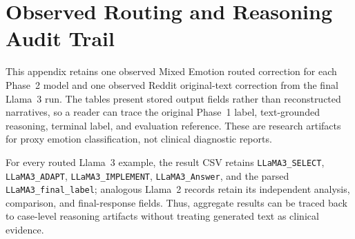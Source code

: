 \documentclass{ieeeaccess}
\begin{document}
\section{Observed Routing and Reasoning Audit Trail}

This appendix retains one observed Mixed Emotion routed correction for each Phase~2 model and one observed Reddit original-text correction from the final Llama~3 run. The tables present stored output fields rather than reconstructed narratives, so a reader can trace the original Phase~1 label, text-grounded reasoning, terminal label, and evaluation reference. These are research artifacts for proxy emotion classification, not clinical diagnostic reports.

For every routed Llama~3 example, the result CSV retains \texttt{LLaMA3\_SELECT}, \texttt{LLaMA3\_ADAPT}, \texttt{LLaMA3\_IMPLEMENT}, \texttt{LLaMA3\_Answer}, and the parsed \texttt{LLaMA3\_final\_label}; analogous Llama~2 records retain its independent analysis, comparison, and final-response fields. Thus, aggregate results can be traced back to case-level reasoning artifacts without treating generated text as clinical evidence.
\end{document}
